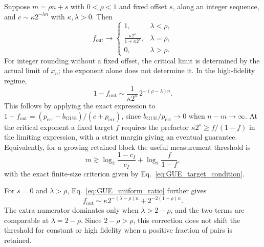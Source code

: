 \documentclass[onecolumn,prx,longbibliography,nofootinbib, superscriptaddress]{revtex4-2}
\theoremstyle{recap}
\begin{document}
Suppose $m=\rho n+s$ with $0<\rho<1$ and fixed offset $s$, along an integer sequence, and $c\sim\kappa2^{-\lambda n}$ with $\kappa,\lambda>0$. Then
\begin{equation}\label{eq:GUE_exponential_threshold}
    f_{\mathrm{out}}\longrightarrow
    \begin{cases}
        1,&\lambda<\rho,\\
        \displaystyle\frac{\kappa2^s}{1+\kappa2^s},&\lambda=\rho,\\
        0,&\lambda>\rho.
    \end{cases}
\end{equation}
For integer rounding without a fixed offset, the critical limit is determined by the actual limit of $x_n$; the exponent alone does not determine it. In the high-fidelity regime,
\begin{equation}
    1-f_{\mathrm{out}}\sim\frac{1}{\kappa2^s}\,2^{-(\rho-\lambda)n}.
\end{equation}
This follows by applying the exact expression to $1-f_{\mathrm{out}}=(p_{\mathrm{err}}-b_{\mathrm{GUE}})/(c+p_{\mathrm{err}})$, since $b_{\mathrm{GUE}}/p_{\mathrm{err}}\to0$ when $n-m\to\infty$. At the critical exponent a fixed target $f$ requires the prefactor $\kappa2^s\geq f/(1-f)$ in the limiting expression, with a strict margin giving an eventual guarantee. Equivalently, for a growing retained block the useful measurement threshold is
\begin{equation}
    m\gtrsim\log_2\frac{1-c_I}{c_I}+\log_2\frac{f}{1-f},
\end{equation}
with the exact finite-size criterion given by Eq.~\eqref{eq:GUE_target_condition}.

For $s=0$ and $\lambda>\rho$, Eq.~\eqref{eq:GUE_uniform_ratio} further gives
\begin{equation}\label{eq:GUE_small_fidelity_scaling}
    f_{\mathrm{out}}\sim
      \kappa2^{-(\lambda-\rho)n}+2^{-2(1-\rho)n}.
\end{equation}
The extra numerator dominates only when $\lambda>2-\rho$, and the two terms are comparable at $\lambda=2-\rho$. Since $2-\rho>\rho$, this correction does not shift the threshold for constant or high fidelity when a positive fraction of pairs is retained.
\end{document}
